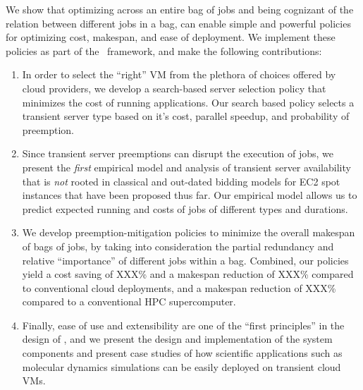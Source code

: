 %
We show that optimizing across an entire bag of jobs and being cognizant of the relation between different jobs in a bag, can enable simple and powerful policies for optimizing cost, makespan, and ease of deployment.
%
We implement these policies as part of the \sysname~framework, and make the following contributions:
\vspace*{-6pt}
\begin{enumerate}[leftmargin=12pt]
\item In order to select the ``right'' VM from the plethora of choices offered by cloud providers, we develop a search-based server selection policy that minimizes the cost of running applications. Our search based policy selects a transient server type based on it's cost, parallel speedup, and probability of preemption. 

  
\item Since transient server preemptions can disrupt the execution of jobs, we present the \emph{first} empirical model and analysis of transient server availability that is \emph{not} rooted in classical and out-dated bidding models for EC2 spot instances that have been proposed thus far. Our empirical model allows us to predict expected running and costs of jobs of different types and durations. 

  
\item We develop preemption-mitigation policies to minimize the overall makespan of bags of jobs, by taking into consideration the partial redundancy and relative ``importance'' of different jobs within a bag. Combined, our policies yield a cost saving of XXX\% and a makespan reduction of XXX\% compared to conventional cloud deployments, and a makespan reduction of XXX\% compared to a conventional HPC supercomputer. 

\item Finally, ease of use and extensibility are one of the ``first principles'' in the design of \sysname, and we present the design and implementation of the system components and present case studies of how  scientific applications such as molecular dynamics simulations can be easily deployed on transient cloud VMs. 
\end{enumerate}


